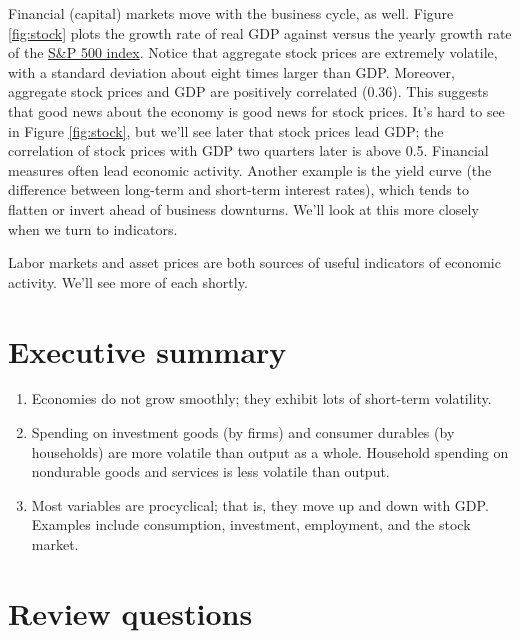 Financial (capital) markets move with the business cycle, as well. Figure \ref{fig:stock} plots the growth rate of real GDP against versus the yearly growth rate of the \href{http://research.stlouisfed.org/fred2/series/SP500}{S\&P 500 index}. Notice that aggregate stock prices are extremely volatile, with a standard deviation about eight times larger than GDP. Moreover, aggregate stock prices and GDP are positively correlated (0.36). This suggests that good news about the economy is good news for stock prices.
It's hard to see in Figure \ref{fig:stock},
but we'll see later that stock prices lead GDP;
the correlation of stock prices with GDP two quarters later is above 0.5. Financial
measures often lead economic activity. Another example is the yield curve (the difference
between long-term and short-term interest rates),
which tends to flatten or invert ahead of business downturns.
We'll look at this more closely when we turn to indicators.


Labor markets and asset prices are
both sources of useful indicators of economic activity.
We'll see more of each shortly.


\section*{Executive summary}

\setlength{\leftmargini}{.5\oldleftmargini}
\begin{enumerate}
\item Economies do not grow smoothly; they exhibit lots of
short-term volatility.

\item Spending on investment goods (by firms)
and consumer durables (by households) are more volatile
 than output as a whole.
 Household spending on nondurable goods and services
 is less volatile than output.

\item Most variables are procyclical; that is, they move up and down with GDP.
Examples include consumption, investment, employment, and the stock market.
\end{enumerate}
\setlength{\leftmargini}{\oldleftmargini}

\section*{Review questions}

